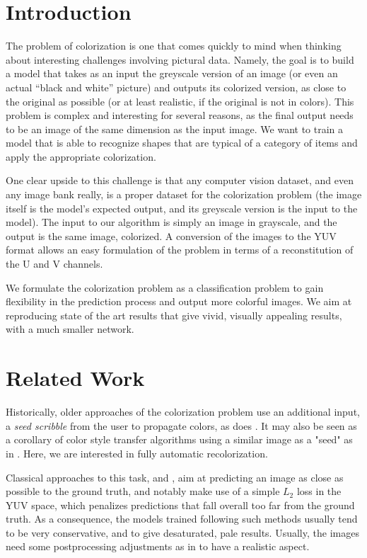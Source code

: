 \documentclass[10pt,twocolumn,letterpaper]{article}
\begin{document}
\section*{Introduction}

The problem of colorization is one that comes quickly to mind when thinking about interesting challenges involving pictural data. Namely, the goal is to build a model that takes as an input the greyscale version of an image (or even an actual ``black and white'' picture) and outputs its colorized version, as close to the original as possible (or at least realistic, if the original is not in colors). This problem is complex and interesting for several reasons, as the final output needs to be an image of the same dimension as the input image. We want to train a model that is able to recognize shapes that are typical of a category of items and apply the appropriate colorization.

One clear upside to this challenge is that any computer vision dataset, and even any image bank really, is a proper dataset for the colorization problem (the image itself is the model's expected output, and its greyscale version is the input to the model).
The input to our algorithm is simply an image in grayscale, and the output is the same image, colorized. A conversion of the images to the YUV format allows an easy formulation of the problem in terms of a reconstitution of the U and V channels.

We formulate the colorization problem as a classification problem to gain flexibility in the prediction process and output more colorful images. We aim at reproducing state of the art results that give vivid, visually appealing results, with a much smaller network.

\section{Related Work} \label{relatedwork}

Historically, older approaches of the colorization problem use an additional input, a \textit{seed scribble} from the user to propagate colors, as does \cite{levin2004colorization}. It may also be seen as a corollary of color style transfer algorithms using a similar image as a "seed" as in \cite{he2017neuralct}. Here, we are interested in fully automatic recolorization.

Classical approaches to this task, \eg \cite{cheng2015deep} and \cite{dahl2016tinyclouds}, aim at predicting an image as close as possible to the ground truth, and notably make use of a simple $L_2$ loss in the YUV space, which penalizes predictions that fall overall too far from the ground truth. As a consequence, the models trained following such methods usually tend to be very conservative, and to give desaturated, pale results. Usually, the images need some postprocessing adjustments as in \cite{deshpande2015learning} to have a realistic aspect.
\end{document}
